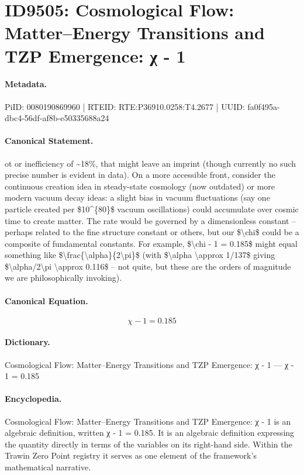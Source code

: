 \section*{ID9505: Cosmological Flow: Matter–Energy Transitions and TZP Emergence: χ - 1}
\paragraph{Metadata.}
PiID: 0080190869960 | RTEID: RTE:P36910.0258:T4.2677 | UUID: fa0f495a-dbc4-56df-af8b-e50335688a24

\paragraph{Canonical Statement.}
ot or inefficiency of \textasciitilde{}18\%, that might leave an imprint (though currently no such precise number is evident in data). On a more accessible front, consider the continuous creation idea in steady-state cosmology (now outdated) or more modern vacuum decay ideas: a slight bias in vacuum fluctuations (say one particle created per \$10\textasciicircum{}\{80\}\$ vacuum oscillations) could accumulate over cosmic time to create matter. The rate would be governed by a dimensionless constant – perhaps related to the fine structure constant or others, but our \$\textbackslash{}chi\$ could be a composite of fundamental constants. For example, \$\textbackslash{}chi - 1 = 0.185\$ might equal something like \$\textbackslash{}frac\{\textbackslash{}alpha\}\{2\textbackslash{}pi\}\$ (with \$\textbackslash{}alpha \textbackslash{}approx 1/137\$ giving \$\textbackslash{}alpha/2\textbackslash{}pi \textbackslash{}approx 0.116\$ – not quite, but these are the orders of magnitude we are philosophically invoking).

\paragraph{Canonical Equation.}
\[
\chi - 1 = 0.185
\]

\paragraph{Dictionary.}
Cosmological Flow: Matter–Energy Transitions and TZP Emergence: χ - 1 — χ - 1 = 0.185

\paragraph{Encyclopedia.}
Cosmological Flow: Matter–Energy Transitions and TZP Emergence: χ - 1 is an algebraic definition, written χ - 1 = 0.185. It is an algebraic definition expressing the quantity directly in terms of the variables on its right-hand side. Within the Trawin Zero Point registry it serves as one element of the framework's mathematical narrative.
